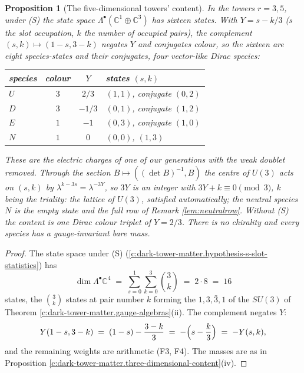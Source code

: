 \documentclass[11pt]{article}
\newtheorem{proposition}[theorem]{Proposition}
\theoremstyle{definition}
\theoremstyle{plain}
\newcommand{\changedmark}[2]{\marginpar{\raggedright\scriptsize\color{#1}#2}}
\providecommand{\C}{}\renewcommand{\C}{\mathbb{C}}
\begin{document}
\begin{proposition}[The five-dimensional towers' content]\label{c:dark-tower-matter.five-dimensional-content}
\changedmark{BurntOrange}{changed since the deposit}
In the towers $r = 3, 5$, under (S) the state space $\Lambda^{\bullet}(\C^{1} \oplus \C^{3})$ has sixteen states. With $Y = s - k/3$ ($s$ the slot occupation, $k$ the number of occupied pairs), the complement $(s,k) \mapsto (1-s, 3-k)$ negates $Y$ and conjugates colour, so the sixteen are eight species-states and their conjugates, four vector-like Dirac species:
\begin{center}\small
\begin{tabular}{@{}lccl@{}}
\toprule
species & colour & $Y$ & states $(s,k)$ \\
\midrule
$U$ & $3$ & $2/3$ & $(1,1)$, conjugate $(0,2)$ \\
$D$ & $3$ & $-1/3$ & $(0,1)$, conjugate $(1,2)$ \\
$E$ & $1$ & $-1$ & $(0,3)$, conjugate $(1,0)$ \\
$N$ & $1$ & $0$ & $(0,0)$, $(1,3)$ \\
\bottomrule
\end{tabular}
\end{center}
These are the electric charges of one of our generations with the weak doublet removed. Through the section $B \mapsto ((\det B)^{-1}, B)$ the centre of $U(3)$ acts on $(s,k)$ by $\lambda^{k - 3s} = \lambda^{-3Y}$, so $3Y$ is an integer with $3Y + k \equiv 0 \pmod 3$, $k$ being the triality: the lattice of $U(3)$, satisfied automatically; the neutral species $N$ is the empty state and the full row of Remark \ref{lem:neutralrow}. Without (S) the content is one Dirac colour triplet of $Y = 2/3$. There is no chirality and every species has a gauge-invariant bare mass.
\end{proposition}
\begin{proof}
The state space under (S) (\ref{c:dark-tower-matter.hypothesis-s-slot-statistics}) has
\[
\dim \Lambda^{\bullet}\C^{4} \;=\; \sum_{s=0}^{1}\sum_{k=0}^{3}\binom{3}{k} \;=\; 2 \cdot 8 \;=\; 16
\]
states, the $\binom{3}{k}$ states at pair number $k$ forming the $1, 3, \bar{3}, 1$ of the $SU(3)$ of Theorem \ref{c:dark-tower-matter.gauge-algebras}(ii). The complement negates $Y$:
\[
Y(1 - s, 3 - k) \;=\; (1 - s) - \frac{3 - k}{3} \;=\; -\Bigl(s - \frac{k}{3}\Bigr) \;=\; -Y(s, k),
\]
and the remaining weights are arithmetic (F3, F4). The masses are as in Proposition \ref{c:dark-tower-matter.three-dimensional-content}(iv).

\end{proof}
\end{document}
